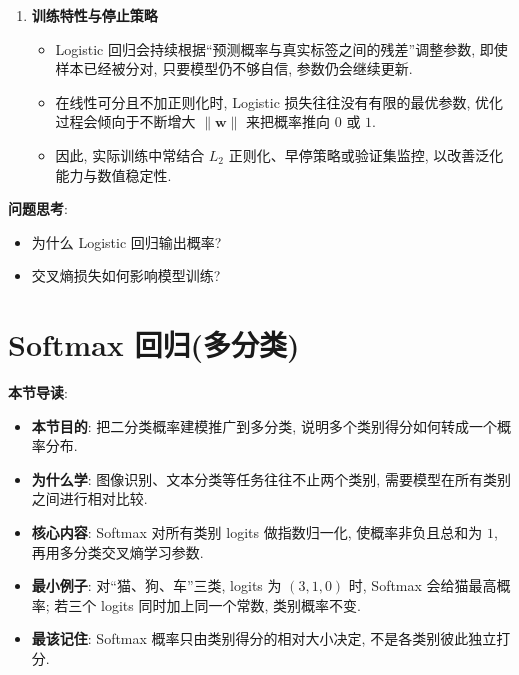 \documentclass{../nndlcourse}
\begin{document}
\begin{enumerate}
\begin{itemize}
\begin{align*}
            &= \frac{1}{N} \sum_{n=1}^N \bigl(\hat{y}^{(n)} - y^{(n)}\bigr) \boldsymbol{x}^{(n)}.
        \end{align*}
        \item 若采用学习率为 $\alpha$ 的梯度下降法, 则参数更新为
        \begin{equation*}
            \boldsymbol{w}_{t+1}
            \leftarrow
            \boldsymbol{w}_t - \alpha \frac{1}{N} \sum_{n=1}^N \bigl(\hat{y}_{\boldsymbol{w}_t}^{(n)} - y^{(n)}\bigr) \boldsymbol{x}^{(n)}.
        \end{equation*}
    \end{itemize}
    \item \textbf{训练特性与停止策略}
    \begin{itemize}
        \item Logistic 回归会持续根据“预测概率与真实标签之间的残差”调整参数, 即使样本已经被分对, 只要模型仍不够自信, 参数仍会继续更新.
        \item 在线性可分且不加正则化时, Logistic 损失往往没有有限的最优参数, 优化过程会倾向于不断增大 $\|\boldsymbol{w}\|$ 来把概率推向 $0$ 或 $1$.
        \item 因此, 实际训练中常结合 $L_2$ 正则化、早停策略或验证集监控, 以改善泛化能力与数值稳定性.
    \end{itemize}
\end{enumerate}

\textbf{问题思考}:
\begin{itemize}
    \item 为什么 Logistic 回归输出概率?
    \item 交叉熵损失如何影响模型训练?
\end{itemize}

\section{Softmax 回归(多分类)}
\textbf{本节导读}:
\begin{itemize}
    \item \textbf{本节目的}: 把二分类概率建模推广到多分类, 说明多个类别得分如何转成一个概率分布.
    \item \textbf{为什么学}: 图像识别、文本分类等任务往往不止两个类别, 需要模型在所有类别之间进行相对比较.
    \item \textbf{核心内容}: Softmax 对所有类别 logits 做指数归一化, 使概率非负且总和为 $1$, 再用多分类交叉熵学习参数.
    \item \textbf{最小例子}: 对“猫、狗、车”三类, logits 为 $(3,1,0)$ 时, Softmax 会给猫最高概率; 若三个 logits 同时加上同一个常数, 类别概率不变.
    \item \textbf{最该记住}: Softmax 概率只由类别得分的相对大小决定, 不是各类别彼此独立打分.
\end{itemize}
\end{document}
